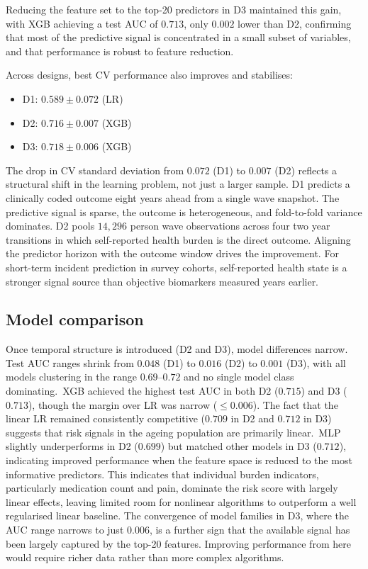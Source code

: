 Reducing the feature set to the top-20 predictors in D3 maintained this gain, with \gls{XGB} achieving a test \gls{AUC} of $0.713$, only $0.002$ lower than D2, confirming that most of the predictive signal is concentrated in a small subset of variables, and that performance is robust to feature reduction.

Across designs, best \gls{CV} performance also improves and stabilises:
\begin{itemize}
    \item[-] D1: $0.589 \pm 0.072$ (\gls{LR})
    \item[-] D2: $0.716 \pm 0.007$ (\gls{XGB})
    \item[-] D3: $0.718 \pm 0.006$ (\gls{XGB})
\end{itemize}

The drop in \gls{CV} standard deviation from $0.072$ (D1) to $0.007$ (D2) reflects a structural shift in the learning problem, not just a larger sample. D1 predicts a clinically coded outcome eight years ahead from a single wave snapshot. The predictive signal is sparse, the outcome is heterogeneous, and fold-to-fold variance dominates. D2 pools $14{,}296$ person wave observations across four two year transitions in which self-reported health burden is the direct outcome. Aligning the predictor horizon with the outcome window drives the improvement. For short-term incident prediction in survey cohorts, self-reported health state is a stronger signal source than objective biomarkers measured years earlier.

\subsection{Model comparison}
Once temporal structure is introduced (D2 and D3), model differences narrow. Test \gls{AUC} ranges shrink from $0.048$ (D1) to $0.016$ (D2) to $0.001$ (D3), with all models clustering in the range $0.69$--$0.72$ and no single model class dominating.\ \gls{XGB} achieved the highest test \gls{AUC} in both D2 ($0.715$) and D3 ($0.713$), though the margin over \gls{LR} was narrow ($\leq 0.006$). The fact that the linear \gls{LR} remained consistently competitive ($0.709$ in D2 and $0.712$ in D3) suggests that risk signals in the ageing population are primarily linear.\ \gls{MLP} slightly underperforms in D2 ($0.699$) but matched other models in D3 ($0.712$), indicating improved performance when the feature space is reduced to the most informative predictors. This indicates that individual burden indicators, particularly medication count and pain, dominate the risk score with largely linear effects, leaving limited room for nonlinear algorithms to outperform a well regularised linear baseline. The convergence of model families in D3, where the \gls{AUC} range narrows to just $0.006$, is a further sign that the available signal has been largely captured by the top-20 features. Improving performance from here would require richer data rather than more complex algorithms.

